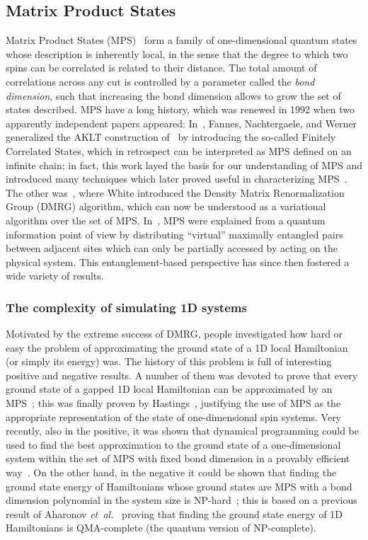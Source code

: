 \documentclass{article}
\theoremstyle{plain}
\theoremstyle{definition}
\numberwithin{equation}{section}  %
\begin{document}
\subsection{Matrix Product States}


Matrix Product States (MPS)~\cite{ostlund-rommer} form a family of
one-dimensional quantum states whose description is inherently local, in
the sense that the degree to which two spins can be correlated is related
to their distance. The total amount of correlations across any cut is
controlled by a parameter called the \emph{bond dimension}, such that
increasing the bond dimension allows to grow the set of states described.
MPS have a long history, which was renewed in 1992 when two apparently
independent papers appeared: In~\cite{fannes:FCS}, Fannes, Nachtergaele,
and Werner generalized the AKLT construction of~\cite{aklt} by introducing
the so-called Finitely Correlated States, which in retrospect can be
interpreted as MPS defined on an infinite chain; in fact, this work layed
the basis for our understanding of MPS and introduced many techniques
which later proved useful in characterizing
MPS~\cite{perez-garcia:mps-reps}.  The other was~\cite{white:DMRG},
where White introduced the Density Matrix Renormalization Group (DMRG)
algorithm, which can now be understood as a variational algorithm over the
set of MPS.  In~\cite{frank:dmrg-mps}, MPS were explained from a quantum
information point of view by distributing ``virtual'' maximally entangled
pairs between adjacent sites which can only be partially accessed by
acting on the physical system.  This entanglement-based perspective has
since then fostered a wide variety of results.


\subsubsection{The complexity of simulating 1D systems}

Motivated by the extreme success of DMRG, people investigated how
hard or easy the problem of approximating the ground state of a 1D local
Hamiltonian (or simply its energy) was. The history of this problem is
full of interesting positive and negative results. A number of them was
devoted to prove that every ground state of a gapped 1D local Hamiltonian
can be approximated by an
MPS~\cite{osborne:1d-gs-approx,frank:faithfully}; this was finally proven
by Hastings~\cite{hastings:arealaw}, justifying the use of
MPS as the appropriate representation of the state of one-dimensional spin
systems.  Very recently, also in the positive, it was shown that dynamical
programming could be used to find the best approximation to the ground
state of a one-dimensional system within the set of MPS with fixed bond
dimension in a provably efficient
way~\cite{schuch:mps-dynprog,aharonov:mps-dynprog}.  On
the other hand, in the negative it could be shown that finding the ground
state energy of Hamiltonians whose ground states are MPS with a
bond dimension polynomial in the system size is
NP-hard~\cite{schuch:mps-gap-np}; this is based on a previous result of
Aharonov \emph{et~al.}~\cite{aharonov:1d-qma} proving that finding the
ground state energy of 1D Hamiltonians is QMA-complete (the quantum
version of NP-complete).
\end{document}

